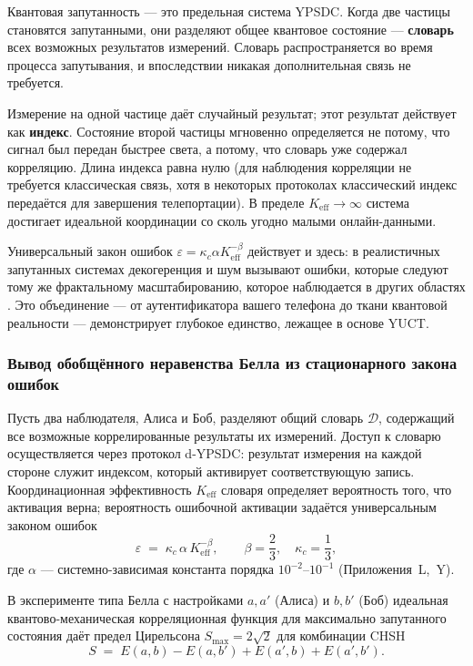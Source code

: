 \documentclass[12pt,a4paper]{article}
\theoremstyle{remark}
\newcommand{\Keff}{K_{\mathrm{eff}}}
\begin{document}
	Квантовая запутанность — это предельная система YPSDC. Когда две частицы становятся запутанными, они разделяют общее квантовое состояние — \textbf{словарь} всех возможных результатов измерений. Словарь распространяется во время процесса запутывания, и впоследствии никакая дополнительная связь не требуется.
	
	Измерение на одной частице даёт случайный результат; этот результат действует как \textbf{индекс}. Состояние второй частицы мгновенно определяется не потому, что сигнал был передан быстрее света, а потому, что словарь уже содержал корреляцию. Длина индекса равна нулю (для наблюдения корреляции не требуется классическая связь, хотя в некоторых протоколах классический индекс передаётся для завершения телепортации). В пределе $\Keff \to \infty$ система достигает идеальной координации со сколь угодно малыми онлайн-данными.
	
	Универсальный закон ошибок $\varepsilon = \kappa_c \alpha K_{\mathrm{eff}}^{-\beta}$ действует и здесь: в реалистичных запутанных системах декогеренция и шум вызывают ошибки, которые следуют тому же фрактальному масштабированию, которое наблюдается в других областях \cite{AppendixG, AppendixS}. Это объединение — от аутентификатора вашего телефона до ткани квантовой реальности — демонстрирует глубокое единство, лежащее в основе YUCT.
	
	\subsubsection{Вывод обобщённого неравенства Белла из стационарного закона ошибок}
	\label{subsec:bell-derivation}
	
	Пусть два наблюдателя, Алиса и Боб, разделяют общий словарь $\mathcal{D}$, содержащий все возможные коррелированные результаты их измерений. Доступ к словарю осуществляется через протокол d-YPSDC: результат измерения на каждой стороне служит индексом, который активирует соответствующую запись. Координационная эффективность $K_{\mathrm{eff}}$ словаря определяет вероятность того, что активация верна; вероятность ошибочной активации задаётся универсальным законом ошибок
	\begin{equation}
		\varepsilon \;=\; \kappa_c\,\alpha\,K_{\mathrm{eff}}^{-\beta},
		\qquad \beta = \frac{2}{3},\quad \kappa_c = \frac{1}{3},
		\label{eq:error-law-bell}
	\end{equation}
	где $\alpha$ — системно-зависимая константа порядка $10^{-2}$–$10^{-1}$ (Приложения~L,~Y).
	
	В эксперименте типа Белла с настройками $a,a'$ (Алиса) и $b,b'$ (Боб) идеальная квантово-механическая корреляционная функция для максимально запутанного состояния даёт предел Цирельсона $S_{\max}=2\sqrt{2}$ для комбинации CHSH
	\[
	S \;=\; E(a,b)-E(a,b')+E(a',b)+E(a',b').
	\]
	
\end{document}
